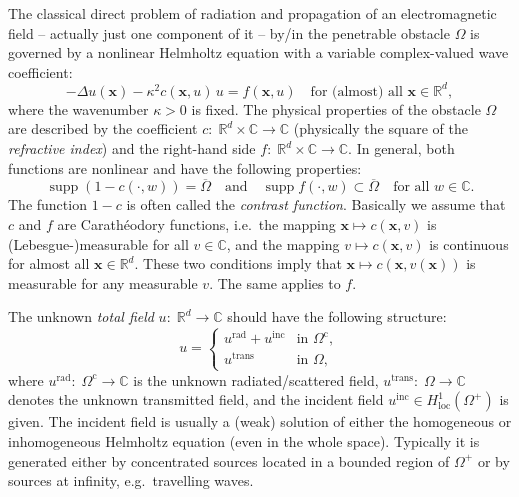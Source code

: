 \documentclass[12pt,DIV=14]{scrartcl}
\providecommand{\C}{\mathbb{C}}
\providecommand{\R}{\mathbb{R}}
\providecommand{\supp}{\operatorname{supp}}
\providecommand{\Om}{\Omega}
\providecommand{\vecx}{\boldsymbol{x}}
\begin{document}
The classical direct problem of radiation and propagation of an electromagnetic field
-- actually just one component of it --
by/in the penetrable obstacle $\Om$ is governed by a nonlinear Helmholtz equation
with a variable complex-valued wave coefficient:
\begin{equation}\label{eq:genscalproblem}
-\Delta u(\vecx) - \kappa^2 c(\vecx,u) \,u = f(\vecx,u)
\quad\text{for (almost) all }
\vecx\in\R^d,
\end{equation}
where the wavenumber $\kappa>0$ is fixed.
The physical properties of the obstacle $\Om$ are described by the coefficient
$c:\;\R^d\times\C\to\C$ (physically the square of the \emph{refractive index}) and
the right-hand side $f:\;\R^d\times\C\to\C$.
In general, both functions are nonlinear and have the following properties:
\begin{equation}\label{eq:ass_nonlin1}
\supp(1-c(\cdot,w)) = \overline\Om
\quad\text{and}\quad
\supp f(\cdot,w) \subset\overline\Om
\quad\text{for all }
w\in\C.
\end{equation}
The function $1-c$ is often called the \emph{contrast function}.
Basically we assume that $c$ and $f$ are Carath\'{e}odory functions,
i.e.\
the mapping $\vecx\mapsto c(\vecx,v)$ is (Lebesgue-)measurable for all $v\in\C$,
and
the mapping $v\mapsto c(\vecx,v)$ is continuous for almost all $\vecx\in\R^d$.
These two conditions imply that $\vecx\mapsto c(\vecx,v(\vecx))$
is measurable for any measurable $v$.
The same applies to $f$.

The unknown \emph{total field} $u:\;\R^d\to\C$ should have the following structure:
\begin{equation}\label{eq:solstructure}
u=\begin{cases}
u^\mathrm{rad} + u^\mathrm{inc} & \text{in }\Om^\mathrm{c},\\
u^\mathrm{trans} & \text{in }\Om,
\end{cases}
\end{equation}
where
$u^\mathrm{rad}:\;\Om^\mathrm{c}\to\C$ is the unknown radiated/scattered field,
$u^\mathrm{trans}:\;\Om\to\C$ denotes the unknown transmitted field,
and the incident field $u^\mathrm{inc}\in H^1_\mathrm{loc}(\Om^+)$ is given.
The incident field is usually a (weak) solution of either the homogeneous or
inhomogeneous Helmholtz equation (even in the whole space).
Typically it is generated either by concentrated sources located
in a bounded region of $\Om^+$ or by sources at infinity, e.g.\ travelling waves.
\end{document}
